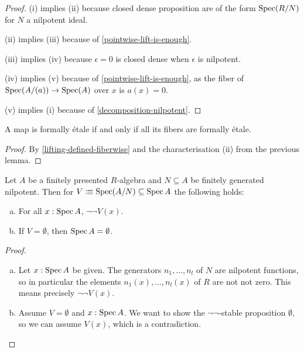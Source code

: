 \begin{proof}
(i) implies (ii) because closed dense proposition are of the form $\operatorname{Spec}(R/N)$ for $N$ a nilpotent ideal.

(ii) implies (iii) because of \cref{pointwise-lift-is-enough}.

(iii) implies (iv) because $\epsilon=0$ is closed dense when $\epsilon$ is nilpotent.

(iv) implies (v) because of \cref{pointwise-lift-is-enough}, as the fiber of $\operatorname{Spec}(A/(a)) \to \operatorname{Spec}(A)$ over $x$ is $a(x)=0$.

(v) implies (i) because of \cref{decomposition-nilpotent}.
\end{proof}

\begin{lemma}
A map is formally étale if and only if all its fibers are formally étale.
\end{lemma}

\begin{proof}
By \cref{lifting-defined-fiberwise} and the characterisation (ii) from the previous lemma.
\end{proof}

\begin{lemma}%
  \label{nilpotent-ideal-not-not-dense}
  Let $A$ be a finitely presented $R$-algebra and $N\subseteq A$ be finitely generated nilpotent.
  Then for $V\vcentcolon\mspace{-1.2mu}\equiv \operatorname{Spec} (A/N)\subseteq \operatorname{Spec} A$ the following holds:
  \begin{enumerate}[(a)]
  \item For all $x:\operatorname{Spec} A$, $\neg\neg V(x)$.
  \item If $V=\emptyset$, then $\operatorname{Spec} A=\emptyset$.
  \end{enumerate}
\end{lemma}

\begin{proof}
  \begin{enumerate}[(a)]
  \item
    Let $x : \operatorname{Spec} A$ be given.
    The generators $n_1,\dots,n_l$ of $N$ are nilpotent functions,
    so in particular the elements $n_1(x), \dots, n_l(x)$ of $R$
    are not not zero.
    This means precisely $\neg\neg V(x)$.
  \item Assume $V=\emptyset$ and $x:\operatorname{Spec} A$.
        We want to show the $\neg\neg$-stable proposition $\emptyset$,
        so we can assume $V(x)$, which is a contradiction.
  \end{enumerate}
\end{proof}

